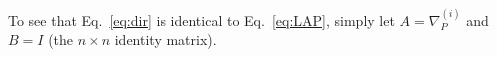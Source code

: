 \documentclass[preprint,11pt]{elsarticle}
\begin{document}
To see that Eq.~\eqref{eq:dir} is identical to Eq.~\eqref{eq:LAP}, 
simply let $A=\nabla_P^{(i)}$ and $B=I$ (the $n\times n$ identity matrix).


\end{document}
